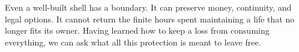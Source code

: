 Even a well-built shell has a boundary. It can preserve money, continuity, and
legal options. It cannot return the finite hours spent maintaining a life that
no longer fits its owner. Having learned how to keep a loss from consuming
everything, we can ask what all this protection is meant to leave free.
